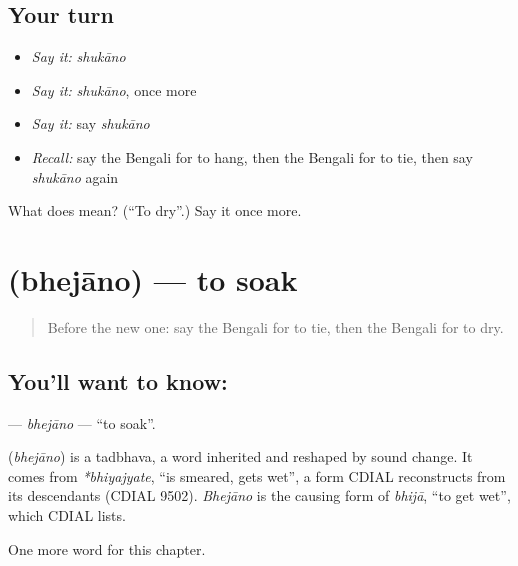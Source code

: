 \subsection*{Your turn}
\begin{itemize}
\raggedright
  \item \emph{Say it:} \emph{shukāno}
  \item \emph{Say it:} \emph{shukāno}, once more
  \item \emph{Say it:} say \emph{shukāno}
  \item \emph{Recall:} say the Bengali for to hang, then the Bengali for to tie, then say \emph{shukāno} again
\end{itemize}

\begin{tcolorbox}[breakable,colback=teal!4,colframe=teal!35!black,title={Before you move on}]
What does  mean? (\textquotedblleft{}To dry\textquotedblright{}.) Say it once more.
\end{tcolorbox}
\section[\texorpdfstring{\bn{ভেজানো} (bhejāno)}{ভেজানো (bhejāno)}]{ (bhejāno) — to soak}

\label{lesson:BN-C152-bhejano}



\begin{quote}
Before the new one: say the Bengali for to tie, then the Bengali for to dry.
\end{quote}

\subsection*{You'll want to know: }
\textbf{} — \emph{bhejāno} — \textquotedblleft{}to soak\textquotedblright{}.

\begin{cousinweb}
\textbf{} (\emph{bhejāno}) is a tadbhava, a word inherited and reshaped by sound change. It comes from \emph{*bhiyajyate}, \textquotedblleft{}is smeared, gets wet\textquotedblright{}, a form CDIAL reconstructs from its descendants (CDIAL 9502). \emph{Bhejāno} is the causing form of \emph{bhijā}, \textquotedblleft{}to get wet\textquotedblright{}, which CDIAL lists.
\end{cousinweb}

\begin{grammarlens}[title={What you've built}]
One more word for this chapter.
\end{grammarlens}

